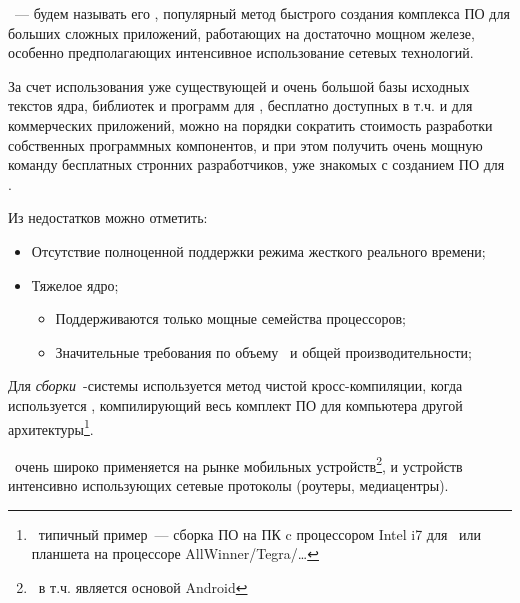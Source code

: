 
\ --- будем называть его \emlinux, популярный
метод быстрого создания комплекса ПО для больших сложных приложений,
работающих на достаточно мощном железе, особенно предполагающих интенсивное
использование сетевых технологий.

За счет использования уже существующей и очень большой базы исходных текстов
ядра, библиотек и программ для \linux, бесплатно доступных в т.ч. и для
коммерческих приложений, можно на порядки сократить стоимость разработки
собственных программных компонентов, и при этом получить очень мощную команду
бесплатных стронних разработчиков, уже знакомых с созданием ПО для \linux.

Из недостатков можно отметить:
\begin{itemize}
  \item Отсутствие полноценной поддержки режима жесткого реального времени;
  \item Тяжелое ядро;
  \begin{itemize}
  \item Поддерживаются только мощные семейства процессоров;
  \item Значительные требования по объему \ram\ и общей производительности;
  \end{itemize}
\end{itemize}

Для \emph{сборки}\ \emlinux-системы используется метод чистой кросс-компиляции,
когда используется , компилирующий весь комплект ПО для
компьютера другой архитектуры\footnote{\ типичный пример\ --- сборка ПО на ПК
c процессором Intel i7 для \raspi\ или планшета на процессоре
AllWinner/Tegra/\ldots}.

\emlinux\ очень широко применяется на рынке мобильных устройств\footnote{\ в
т.ч. является основой Android}, и устройств интенсивно использующих
сетевые протоколы (роутеры, медиацентры).
